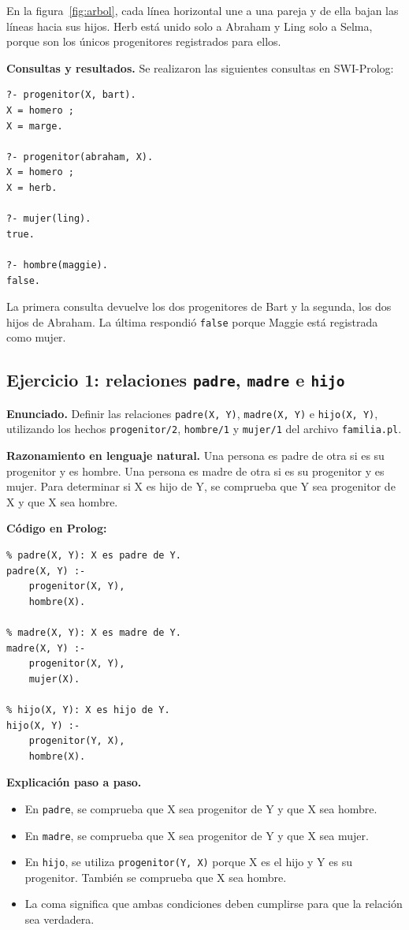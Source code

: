 \documentclass[12pt,letterpaper]{article}
\begin{document}
En la figura~\ref{fig:arbol}, cada línea horizontal une a una pareja y de ella
bajan las líneas hacia sus hijos. Herb está unido solo a Abraham y Ling solo a
Selma, porque son los únicos progenitores registrados para ellos.

\noindent\textbf{Consultas y resultados.} Se realizaron las siguientes consultas en
SWI-Prolog:

\begin{lstlisting}
?- progenitor(X, bart).
X = homero ;
X = marge.

?- progenitor(abraham, X).
X = homero ;
X = herb.

?- mujer(ling).
true.

?- hombre(maggie).
false.
\end{lstlisting}

La primera consulta devuelve los dos progenitores de Bart y la segunda, los dos
hijos de Abraham. La última respondió \texttt{false} porque Maggie está
registrada como mujer.

\subsection{Ejercicio 1: relaciones \texttt{padre}, \texttt{madre} e \texttt{hijo}}

\noindent\textbf{Enunciado.} Definir las relaciones \texttt{padre(X, Y)}, \texttt{madre(X, Y)}
e \texttt{hijo(X, Y)}, utilizando los hechos \texttt{progenitor/2},
\texttt{hombre/1} y \texttt{mujer/1} del archivo \texttt{familia.pl}.

\noindent\textbf{Razonamiento en lenguaje natural.} Una persona es padre de otra si es su
progenitor y es hombre. Una persona es madre de otra si es su progenitor y es
mujer. Para determinar si X es hijo de Y, se comprueba que Y sea progenitor de X
y que X sea hombre.

\noindent\textbf{Código en Prolog:}

\begin{lstlisting}
% padre(X, Y): X es padre de Y.
padre(X, Y) :-
    progenitor(X, Y),
    hombre(X).

% madre(X, Y): X es madre de Y.
madre(X, Y) :-
    progenitor(X, Y),
    mujer(X).

% hijo(X, Y): X es hijo de Y.
hijo(X, Y) :-
    progenitor(Y, X),
    hombre(X).
\end{lstlisting}

\noindent\textbf{Explicación paso a paso.}
\begin{itemize}
  \item En \texttt{padre}, se comprueba que X sea progenitor de Y y que X sea hombre.
  \item En \texttt{madre}, se comprueba que X sea progenitor de Y y que X sea mujer.
  \item En \texttt{hijo}, se utiliza \texttt{progenitor(Y, X)} porque X es el hijo
  y Y es su progenitor. También se comprueba que X sea hombre.
  \item La coma significa que ambas condiciones deben cumplirse para que la
  relación sea verdadera.
\end{itemize}
\end{document}
